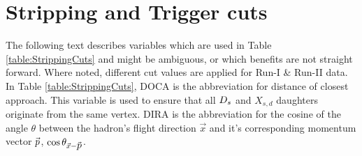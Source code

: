 
\section{Stripping and Trigger cuts}
\label{sec:StripAndTrigger}

The following text describes variables which are used in Table \ref{table:StrippingCuts} and might be ambiguous, or which benefits are not straight forward. 
Where noted, different cut values are applied for Run-I \& Run-II data.
In Table \ref{table:StrippingCuts}, DOCA is the abbreviation for distance of closest approach. This variable is used to ensure that all ${{D}_{s}}$ and $X_{s,d}$ daughters originate from the same vertex.
DIRA is the abbreviation for the cosine of the angle $\theta$ between the hadron's flight direction $\vec{x}$ and it's corresponding momentum vector $\vec{\mbox{$p$}}$, $\cos{\theta_{\vec{x} -\vec{\mbox{$p$}}}}$.
